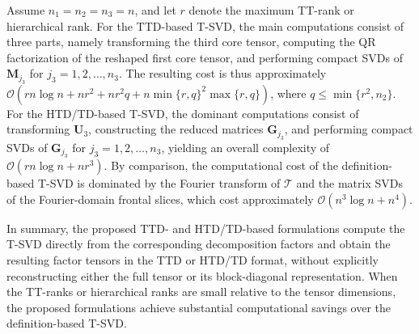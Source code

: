 \documentclass[onefignum,onetabnum]{siamart250211}
\begin{document}
\begin{remark}
Assume $n_1 = n_2 = n_3 = n$, and let $r$ denote the maximum TT-rank or hierarchical rank. For the TTD-based T-SVD, the main computations consist of three parts, namely transforming the third core tensor, computing the QR factorization of the reshaped first core tensor,
and performing compact SVDs of $\textbf{M}_{j_3}$ for $j_3=1,2,\dots,n_3$. The resulting cost is thus approximately $\mathcal{O}(rn\log n+nr^2+ nr^2q + n\min \{r, q\}^2 \max \{r, q\})$, where $q \leq \min\{r^2, n_2\}$.
For the HTD/TD-based T-SVD, the dominant computations consist of transforming $\mathbf{U}_3$, constructing the reduced matrices $\mathbf{G}_{j_3}$, and performing compact SVDs of $\mathbf{G}_{j_3}$ for $j_3=1,2,\ldots,n_3$, yielding an overall complexity of $\mathcal{O}(rn\log n+nr^3).$ By comparison, the computational cost of the definition-based T-SVD is dominated by the Fourier transform of $\mathscr{T}$ and the matrix SVDs of the Fourier-domain frontal slices, which cost approximately $\mathcal{O}(n^3\log n+n^4)$.
\end{remark}


In summary, the proposed TTD- and HTD/TD-based formulations compute the T-SVD directly from the corresponding decomposition factors and obtain the resulting factor tensors in the TTD or HTD/TD format, without explicitly reconstructing either the full tensor or its block-diagonal representation. When the TT-ranks or hierarchical ranks are small relative to the tensor dimensions, the proposed formulations achieve substantial computational savings over the definition-based T-SVD.
\end{document}
